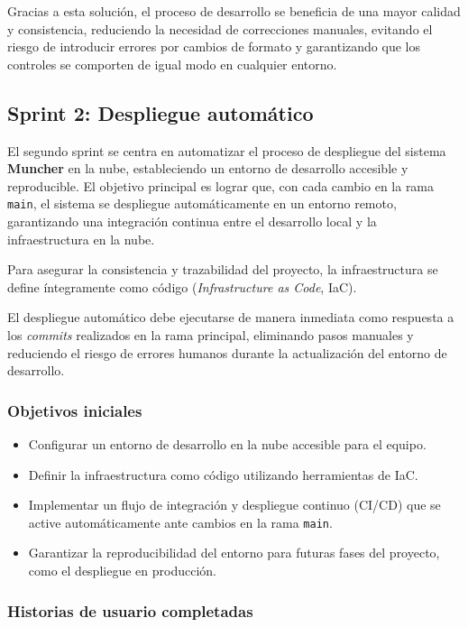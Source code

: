 Gracias a esta solución, el proceso de desarrollo se beneficia de una mayor
calidad y consistencia, reduciendo la necesidad de correcciones manuales,
evitando el riesgo de introducir errores por cambios de formato y garantizando
que los controles se comporten de igual modo en cualquier entorno.

\subsection*{Sprint 2: Despliegue automático}

El segundo sprint se centra en automatizar el proceso de despliegue del sistema
\textbf{Muncher} en la nube, estableciendo un entorno de desarrollo accesible y
reproducible. El objetivo principal es lograr que, con cada cambio en la rama
\texttt{main}, el sistema se despliegue automáticamente en un entorno remoto,
garantizando una integración continua entre el desarrollo local y la
infraestructura en la nube.

Para asegurar la consistencia y trazabilidad del proyecto, la infraestructura
se define íntegramente como código (\textit{Infrastructure as Code}, IaC).

El despliegue automático debe ejecutarse de manera inmediata como respuesta a
los \textit{commits} realizados en la rama principal, eliminando pasos manuales
y reduciendo el riesgo de errores humanos durante la actualización del entorno
de desarrollo.

\subsubsection*{Objetivos iniciales}

\begin{itemize}
	\item Configurar un entorno de desarrollo en la nube accesible para el equipo.
	\item Definir la infraestructura como código utilizando herramientas de IaC.
	\item Implementar un flujo de integración y despliegue continuo (CI/CD) que se active
	      automáticamente ante cambios en la rama \texttt{main}.
	\item Garantizar la reproducibilidad del entorno para futuras fases del proyecto,
	      como el despliegue en producción.
\end{itemize}

\subsubsection*{Historias de usuario completadas}

